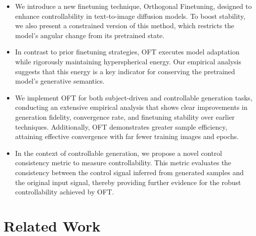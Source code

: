 \begin{itemize}[leftmargin=*,nosep]

    \item We introduce a new finetuning technique, Orthogonal Finetuning, designed to enhance controllability in text-to-image diffusion models. To boost stability, we also present a constrained version of this method, which restricts the model’s angular change from its pretrained state.
    \item In contrast to prior finetuning strategies, OFT executes model adaptation while rigorously maintaining hyperspherical energy. Our empirical analysis suggests that this energy is a key indicator for conserving the pretrained model’s generative semantics.
    \item We implement OFT for both subject-driven and controllable generation tasks, conducting an extensive empirical analysis that shows clear improvements in generation fidelity, convergence rate, and finetuning stability over earlier techniques. Additionally, OFT demonstrates greater sample efficiency, attaining effective convergence with far fewer training images and epochs.
    \item In the context of controllable generation, we propose a novel control consistency metric to measure controllability. This metric evaluates the consistency between the control signal inferred from generated samples and the original input signal, thereby providing further evidence for the robust controllability achieved by OFT.
\end{itemize}

\section{Related Work}

